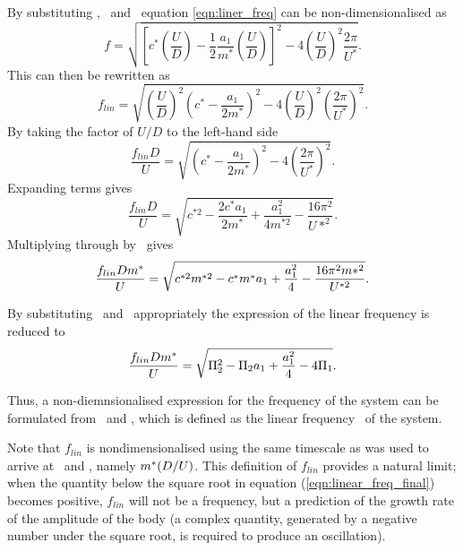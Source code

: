 By substituting \cstar, \mstar\ and \ustar\ equation \ref{eqn:liner_freq} can be non-dimensionalised as
%
\begin{equation}
f = \sqrt{\left[c^*\left(\frac{U}{D}\right) - \frac{1}{2}\frac{a_1}{m^*}\left(\frac{U}{D}\right)\right]^2 - 4\left(\frac{U}{D}\right)^2\frac{2\pi}{U^*}}.
\end{equation}
%
This can then be rewritten as
\begin{equation}
f_{lin} = \sqrt{\left(\frac{U}{D}\right)^2\left(c^*-\frac{a_1}{2m^*}\right)^2 - 4\left(\frac{U}{D}\right)^2\left(\frac{2\pi}{U^*}\right)^2}.
\end{equation}
By taking the factor of $U/D$ to the left-hand side
\begin{equation}
\label{eqn:f_lin}
\frac{f_{lin}D}{U} = \sqrt{\left(c^*-\frac{a_1}{2m^*}\right)^2 - 4\left(\frac{2\pi}{U^*}\right)^2}.
\end{equation}
Expanding terms gives
\begin{equation}
\frac{f_{lin}D}{U} = \sqrt{c^{*2} - \frac{2c^*a_1}{2m^*} + \frac{a_1^2}{4m^{*2}} - \frac{16\pi^2}{U*^2}}.
\end{equation}
Multiplying through by \mstar\ gives
\begin{equation}
\frac{f_{lin}Dm^{*}}{U} = \sqrt{c^{*2}m^{*2} - c^*m^*a_1 + \frac{a_1^2}{4} - \frac{16\pi^2m{*^2}}{U^{*2}}}.
\end{equation}


By substituting \massstiff\ and \massdamp\ appropriately the expression of the linear frequency is reduced to   
\begin{equation}
\label{eqn:linear_freq_final-1}
\frac{f_{lin}Dm^{*}}{U} = \sqrt{\Pi_2^2 - \Pi_2a_1 + \frac{a_1^2}{4} - 4\Pi_1}.
\end{equation}

Thus, a non-diemnsionalised expression for the frequency of the system can be formulated from \massstiff\ and \massdamp, which is defined as the linear frequency  \freqlin\ of the system.

Note that $f_{lin}$ is nondimensionalised using the same timescale as was used to arrive at \massstiff\ and \massdamp, namely $m^{*}(D/U)$. This definition of $f_{lin}$ provides a natural limit; when the quantity below the square root in equation (\ref{eqn:linear_freq_final}) becomes positive, $f_{lin}$ will not be a frequency, but a prediction of the growth rate of the amplitude of the body (a complex quantity, generated by a negative number under the square root, is required to produce an oscillation).

